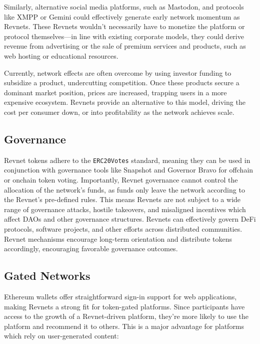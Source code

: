 \documentclass{article}
\begin{document}
Similarly, alternative social media platforms, such as Mastodon, and protocols like XMPP or Gemini could effectively generate early network momentum as Revnets. These Revnets wouldn't necessarily have to monetize the platform or protocol themselves---in line with existing corporate models, they could derive revenue from advertising or the sale of premium services and products, such as web hosting or educational resources. 

Currently, network effects are often overcome by using investor funding to subsidize a product, undercutting competition. Once these products secure a dominant market position, prices are increased, trapping users in a more expensive ecosystem. Revnets provide an alternative to this model, driving the cost per consumer down, or into profitability as the network achieves scale.

\subsection{Governance}

Revnet tokens adhere to the \texttt{ERC20Votes} standard, meaning they can be used in conjunction with governance tools like Snapshot and Governor Bravo for offchain or onchain token voting. Importantly, Revnet governance cannot control the allocation of the network's funds, as funds only leave the network according to the Revnet's pre-defined rules. This means Revnets are not subject to a wide range of governance attacks, hostile takeovers, and misaligned incentives which affect DAOs and other governance structures. Revnets can effectively govern DeFi protocols, software projects, and other efforts across distributed communities. Revnet mechanisms encourage long-term orientation and distribute tokens accordingly, encouraging favorable governance outcomes.

\subsection{Gated Networks}

Ethereum wallets offer straightforward sign-in support for web applications, making Revnets a strong fit for token-gated platforms. Since participants have access to the growth of a Revnet-driven platform, they're more likely to use the platform and recommend it to others. This is a major advantage for platforms which rely on user-generated content:
\end{document}

